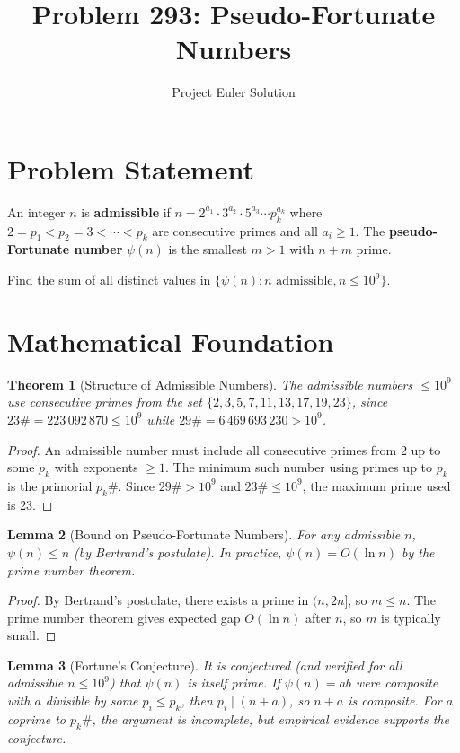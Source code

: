 \documentclass[12pt]{article}
\title{Problem 293: Pseudo-Fortunate Numbers}
\author{Project Euler Solution}
\date{}
\newtheorem{theorem}{Theorem}
\newtheorem{lemma}[theorem]{Lemma}
\begin{document}
\maketitle

\section{Problem Statement}
An integer $n$ is \textbf{admissible} if $n = 2^{a_1} \cdot 3^{a_2} \cdot 5^{a_3} \cdots p_k^{a_k}$ where $2 = p_1 < p_2 = 3 < \cdots < p_k$ are consecutive primes and all $a_i \geq 1$. The \textbf{pseudo-Fortunate number} $\psi(n)$ is the smallest $m > 1$ with $n + m$ prime.

Find the sum of all distinct values in $\{\psi(n) : n \text{ admissible}, n \leq 10^9\}$.

\section{Mathematical Foundation}

\begin{theorem}[Structure of Admissible Numbers]
The admissible numbers $\leq 10^9$ use consecutive primes from the set $\{2, 3, 5, 7, 11, 13, 17, 19, 23\}$, since $23\# = 223\,092\,870 \leq 10^9$ while $29\# = 6\,469\,693\,230 > 10^9$.
\end{theorem}

\begin{proof}
An admissible number must include all consecutive primes from 2 up to some $p_k$ with exponents $\geq 1$. The minimum such number using primes up to $p_k$ is the primorial $p_k\#$. Since $29\# > 10^9$ and $23\# \leq 10^9$, the maximum prime used is 23.
\end{proof}

\begin{lemma}[Bound on Pseudo-Fortunate Numbers]
For any admissible $n$, $\psi(n) \leq n$ (by Bertrand's postulate). In practice, $\psi(n) = O(\ln n)$ by the prime number theorem.
\end{lemma}

\begin{proof}
By Bertrand's postulate, there exists a prime in $(n, 2n]$, so $m \leq n$. The prime number theorem gives expected gap $O(\ln n)$ after $n$, so $m$ is typically small.
\end{proof}

\begin{lemma}[Fortune's Conjecture]
It is conjectured (and verified for all admissible $n \leq 10^9$) that $\psi(n)$ is itself prime. If $\psi(n) = ab$ were composite with $a$ divisible by some $p_i \leq p_k$, then $p_i \mid (n + a)$, so $n + a$ is composite. For $a$ coprime to $p_k\#$, the argument is incomplete, but empirical evidence supports the conjecture.
\end{lemma}
\end{document}
